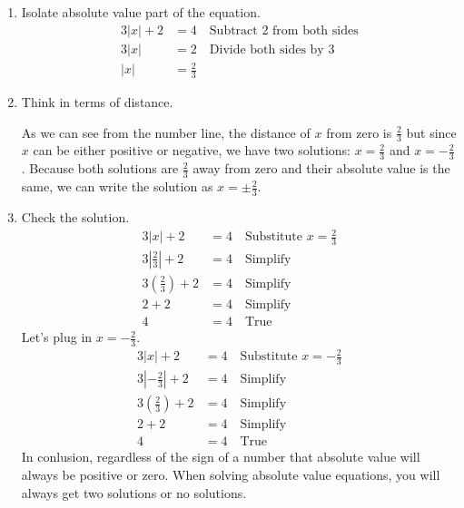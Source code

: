 \begin{enumerate}
	\item Isolate absolute value part of the equation.
	      \begin{align*}
		      3|x|+2 & =4 \quad \text{Subtract 2 from both sides} \\
		      3|x|   & =2 \quad \text{Divide both sides by 3}     \\
		      |x|    & =\frac{2}{3}
	      \end{align*}
	\item Think in terms of distance. \\
	      As we can see from the number line, the distance of $x$ from zero is $\frac{2}{3}$ but since $x$ can be either positive or negative, we have two solutions: $x=\frac{2}{3}$ and $x=-\frac{2}{3}$. Because both solutions are $\frac{2}{3}$ away from zero and their absolute value is the same, we can write the solution as $x=\pm\frac{2}{3}$.
	\item  Check the solution. \\
	      \begin{align*}
		      3|x|+2                      & =4 \quad \text{Substitute $x=\frac{2}{3}$} \\
		      3\left|\frac{2}{3}\right|+2 & =4 \quad \text{Simplify}                   \\
		      3\left(\frac{2}{3}\right)+2 & =4 \quad \text{Simplify}                   \\
		      2+2                         & =4 \quad \text{Simplify}                   \\
		      4                           & =4 \quad \text{True}
	      \end{align*}
	      Let's plug in $x=-\frac{2}{3}$.
	      \begin{align*}
		      3|x|+2                       & =4 \quad \text{Substitute $x=-\frac{2}{3}$} \\
		      3\left|-\frac{2}{3}\right|+2 & =4 \quad \text{Simplify}                    \\
		      3\left(\frac{2}{3}\right)+2  & =4 \quad \text{Simplify}                    \\
		      2+2                          & =4 \quad \text{Simplify}                    \\
		      4                            & =4 \quad \text{True}
	      \end{align*}
	      In conlusion, regardless of the sign of a number that absolute value will always be positive or zero. When solving absolute value equations, you will always get two solutions or no solutions.
\end{enumerate}

